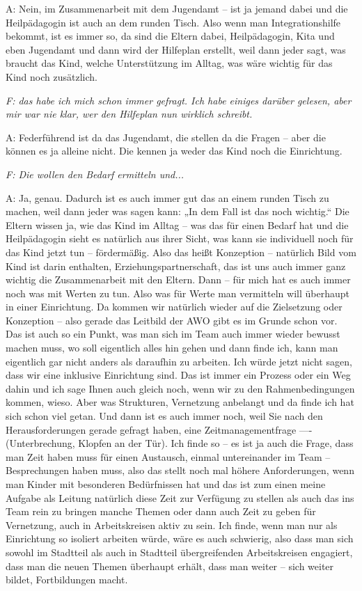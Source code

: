 A: Nein, im Zusammenarbeit mit dem Jugendamt -- ist ja jemand dabei und die Heilpädagogin ist auch an dem runden Tisch. Also wenn man Integrationshilfe bekommt, ist es immer so, da sind die Eltern dabei, Heilpädagogin, Kita und eben Jugendamt und dann wird der Hilfeplan erstellt, weil dann jeder sagt, was braucht das Kind, welche Unterstützung im Alltag, was wäre wichtig für das Kind noch zusätzlich. 

\emph{F: das habe ich mich schon immer gefragt. Ich habe einiges darüber gelesen, aber mir war nie klar, wer den Hilfeplan nun wirklich schreibt.}

A: Federführend ist da das Jugendamt, die stellen da die Fragen -- aber die können es ja alleine nicht. Die kennen ja weder das Kind noch die Einrichtung. 

\emph{F: Die wollen den Bedarf ermitteln und...}

A: Ja, genau. Dadurch ist es auch immer gut das an einem runden Tisch zu machen, weil dann jeder was sagen kann: „In dem Fall ist das noch wichtig.“ Die Eltern wissen ja, wie das Kind im Alltag -- was das für einen Bedarf hat und die Heilpädagogin sieht es natürlich aus ihrer Sicht, was kann sie individuell noch für das Kind jetzt tun -- fördermäßig. Also das heißt Konzeption -- natürlich Bild vom Kind ist darin enthalten, Erziehungspartnerschaft, das ist uns auch immer ganz wichtig die Zusammenarbeit mit den Eltern. Dann -- für mich hat es auch immer noch was mit Werten zu tun. Also was für Werte man vermitteln will überhaupt in einer Einrichtung. Da kommen wir natürlich wieder auf die Zielsetzung oder Konzeption -- also gerade das Leitbild der AWO gibt es im Grunde schon vor. Das ist auch so ein Punkt, was man sich im Team auch immer wieder bewusst machen muss, wo soll eigentlich alles hin gehen und dann finde ich, kann man eigentlich gar nicht anders als daraufhin zu arbeiten. Ich würde jetzt nicht sagen, dass wir eine inklusive Einrichtung sind. Das ist immer ein Prozess oder ein Weg dahin und ich sage Ihnen auch gleich noch, wenn 
wir zu den Rahmenbedingungen kommen, wieso. Aber was Strukturen, Vernetzung anbelangt und da finde ich hat sich schon viel getan. Und dann ist es auch immer noch, weil Sie nach den Herausforderungen gerade gefragt haben, eine Zeitmanagementfrage ---- (Unterbrechung, Klopfen an der Tür). Ich finde so -- es ist ja auch die Frage, dass man Zeit haben muss für einen Austausch, einmal untereinander im Team -- Besprechungen haben muss, also das stellt noch mal höhere Anforderungen, wenn man Kinder mit besonderen Bedürfnissen hat und das ist zum einen 
meine Aufgabe als Leitung natürlich diese Zeit zur Verfügung zu stellen als auch das ins Team rein zu bringen manche Themen oder dann auch Zeit zu geben für Vernetzung, auch in Arbeitskreisen aktiv zu sein. Ich finde, wenn man nur als Einrichtung so isoliert arbeiten würde, wäre es auch schwierig, also dass man sich sowohl im Stadtteil als auch in Stadtteil übergreifenden Arbeitskreisen engagiert, dass man die neuen Themen überhaupt erhält, dass man weiter -- sich weiter bildet, Fortbildungen macht. 

